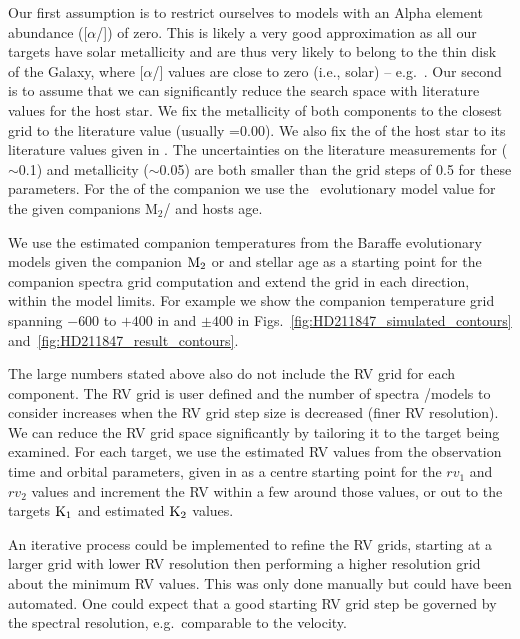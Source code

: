 Our first assumption is to restrict ourselves to models with an Alpha element abundance ([\(\alpha\)/]) of zero. This is likely a very good approximation as all our targets have solar metallicity and are thus very likely to belong to the thin disk of the Galaxy, where [\(\alpha\)/] values are close to zero (i.e., solar) -- e.g.~\citet{adibekyan_chemical_2012}. Our second is to assume that we can significantly reduce the search space with literature values for the host star. We fix the metallicity of both components to the closest grid to the literature value (usually \feh{}=0.00). We also fix the \logg{} of the host star to its literature values given in . The uncertainties on the literature measurements for \logg{} (\(\sim\)0.1) and metallicity (\(\sim\)0.05) are both smaller than the grid steps of 0.5 for these parameters.
For the \logg{} of the companion we use the~\citet{baraffe_evolutionary_2003,baraffe_new_2015} evolutionary model value for the given companions \(\textrm{M}_2\)/\mtwosini{} and hosts age.

We use the estimated companion temperatures from the Baraffe evolutionary models given the companion \(\rm M_2\) or \mtwosini{} and stellar age as a starting point for the companion spectra grid computation and extend the grid in each direction, within the model limits. For example we show the companion temperature grid spanning \(-600\) to \(+400\)\K{} in  and \(\pm400\)\K{} in Figs.~\ref{fig:HD211847_simulated_contours} and~\ref{fig:HD211847_result_contours}.

The large numbers stated above also do not include the {RV} grid for each component. The {RV} grid is user defined and the number of spectra /models to consider increases when the {RV} grid step size is decreased (finer {RV} resolution). We can reduce the {RV} grid space significantly by tailoring it to the target being examined. For each target, we use the estimated {RV} values from the observation time and orbital parameters, given in  as a centre starting point for the \({rv}_1\) and \({rv}_2\) values and increment the {RV} within a few {\fwhm} around those values, or out to the targets \(\rm K_1\) and estimated \(\rm K_2\) values.

An iterative process could be implemented to refine the {RV} grids, starting at a larger grid with lower {RV} resolution then performing a higher resolution grid about the minimum \textchisquared{} {RV} values. This was only done manually but could have been automated. One could expect that a good starting {RV} grid step be governed by the spectral resolution, e.g.\ comparable to the {\fwhm} velocity.

